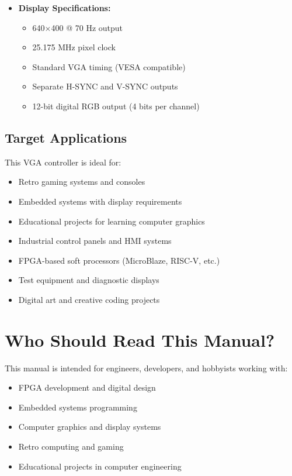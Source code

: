 \documentclass[11pt,letterpaper]{report}
\begin{document}
\begin{itemize}
    \item \textbf{Display Specifications:}
    \begin{itemize}
        \item 640$\times$400 @ 70 Hz output
        \item 25.175 MHz pixel clock
        \item Standard VGA timing (VESA compatible)
        \item Separate H-SYNC and V-SYNC outputs
        \item 12-bit digital RGB output (4 bits per channel)
    \end{itemize}
\end{itemize}

\subsection{Target Applications}

This VGA controller is ideal for:

\begin{itemize}
    \item Retro gaming systems and consoles
    \item Embedded systems with display requirements
    \item Educational projects for learning computer graphics
    \item Industrial control panels and HMI systems
    \item FPGA-based soft processors (MicroBlaze, RISC-V, etc.)
    \item Test equipment and diagnostic displays
    \item Digital art and creative coding projects
\end{itemize}

\section{Who Should Read This Manual?}

This manual is intended for engineers, developers, and hobbyists working with:

\begin{itemize}
    \item FPGA development and digital design
    \item Embedded systems programming
    \item Computer graphics and display systems
    \item Retro computing and gaming
    \item Educational projects in computer engineering
\end{itemize}
\end{document}
